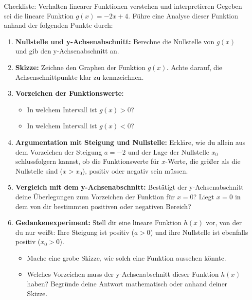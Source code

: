 \begin{aufgabenumgebung}{Checkliste: Verhalten linearer Funktionen verstehen und interpretieren}
Gegeben sei die lineare Funktion $g(x) = -2x + 4$.
Führe eine Analyse dieser Funktion anhand der folgenden Punkte durch:

\begin{enumerate}[label=(\alph*)]
    \item \textbf{Nullstelle und y-Achsenabschnitt:} Berechne die Nullstelle von $g(x)$ und gib den y-Achsenabschnitt an.
    \item \textbf{Skizze:} Zeichne den Graphen der Funktion $g(x)$. Achte darauf, die Achsenschnittpunkte klar zu kennzeichnen.
    \item \textbf{Vorzeichen der Funktionswerte:}
    \begin{itemize}
        \item In welchem Intervall ist $g(x) > 0$?
        \item In welchem Intervall ist $g(x) < 0$?
    \end{itemize}
    \item \textbf{Argumentation mit Steigung und Nullstelle:} Erkläre, wie du allein aus dem Vorzeichen der Steigung $a=-2$ und der Lage der Nullstelle $x_0$ schlussfolgern kannst, ob die Funktionswerte für $x$-Werte, die größer als die Nullstelle sind ($x > x_0$), positiv oder negativ sein müssen.
    \item \textbf{Vergleich mit dem y-Achsenabschnitt:} Bestätigt der y-Achsenabschnitt deine Überlegungen zum Vorzeichen der Funktion für $x=0$? Liegt $x=0$ in dem von dir bestimmten positiven oder negativen Bereich?
    \item \textbf{Gedankenexperiment:} Stell dir eine lineare Funktion $h(x)$ vor, von der du nur weißt: Ihre Steigung ist positiv ($a > 0$) und ihre Nullstelle ist ebenfalls positiv ($x_0 > 0$).
    \begin{itemize}
        \item Mache eine grobe Skizze, wie solch eine Funktion aussehen könnte.
        \item Welches Vorzeichen muss der y-Achsenabschnitt dieser Funktion $h(x)$ haben? Begründe deine Antwort mathematisch oder anhand deiner Skizze.
    \end{itemize}
\end{enumerate}
\end{aufgabenumgebung}



